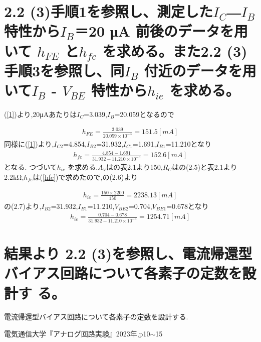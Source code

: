 \documentclass[a4j,10pt,dvipdfmx]{jarticle}
\begin{document}
\section{2.2 (3)手順1を参照し、測定した$I_C$―$I_B$ 特性から$I_B$＝20 μA 前後のデータを用いて
$h_{FE}$ と$h_{fe}$ を求める。また2.2 (3)手順3を参照し、同$I_B$ 付近のデータを用いて$I_B$ - $V_{BE}$
特性から$h_{ie}$ を求める。}
(\ref{1})より,20μAあたりは$I_C$=3.039,$I_B$=20.059となるので

\begin{eqnarray}
  \label{hFE}
  h_{FE}=\frac{3.039}{20.059\times10^{-3}}=151.5[mA]
\end{eqnarray}
同様に(\ref{1})より,$I_{C2}$=4.854,$I_{B2}$=31.932,$I_{C1}$=1.691,$I_{B1}$=11.210となり
\begin{eqnarray}
  \label{hfe}
  h_{fe}=\frac{4.854-1.691}{31.932-11.210\times10^{-3}}=152.6[mA]
\end{eqnarray}
となる.
つづいて$h_{ie}$ を求める.$A_V$は\cite{a}の表2.1より150,$R_C$は\cite{a}の(2.5)と表2.1より2.2kΩ,$h_{fe}$は(\ref{hfe})で求めたので,\cite{a}の(2.6)より

\begin{eqnarray}
  \label{hie}
  h_{ie}=\frac{150\times{2200}}{150}=2238.13[mA]
\end{eqnarray}
\cite{a}の(2.7)より,$I_{B2}$=31.932,$I_{B1}$=11.210,$V_{BE2}$=0.704,$V_{BE1}$=0.678となり
\begin{eqnarray}
  \label{hie2}
  h_{ie}=\frac{0.704-0.678}{31.932-11.210\times10^{-3}}=1254.71[mA]
\end{eqnarray}

\section{結果より 2.2 (3)を参照し、電流帰還型バイアス回路について各素子の定数を設計す
る。}
電流帰還型バイアス回路について各素子の定数を設計する.

\begin{thebibliography}{9}
   電気通信大学『アナログ回路実験』2023年,p10$\sim$15
\end{thebibliography}
\end{document}
